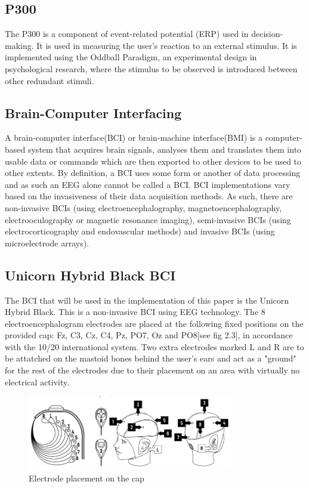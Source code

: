 \subsection{P300}
The P300 is a component of event-related potential (ERP) used in decision-making. It is used in measuring the user's reaction to an external stimulus. It is implemented using the Oddball Paradigm, an experimental design in psychological research, where the stimulus to be observed is introduced between other redundant stimuli.

\subsection{Brain-Computer Interfacing}
A brain-computer interface(BCI) or brain-machine interface(BMI) is a computer-based system that acquires brain signals, analyses them and translates them into usable data or commands which are then exported to other devices to be used to other extents. By definition, a BCI uses some form or another of data processing and as such an EEG alone cannot be called a BCI\cite{Shih_2012}. BCI implementations vary based on the invasiveness of their data acquisition methods. As such, there are non-invasive BCIs (using electroencephalography, magnetoencephalography, electrooculography or magnetic resonance imaging), semi-invasive BCIs (using electrocorticography and endovascular methods) and invasive BCIs (using microelectrode arrays).

\subsection{Unicorn Hybrid Black BCI}
The BCI that will be used in the implementation of this paper is the Unicorn Hybrid Black. This is a non-invasive BCI using EEG technology. The 8 electroencephalogram electrodes are placed at the following fixed positions on the provided cap: Fz, C3, Cz, C4, Pz, PO7, Oz and PO8[see fig 2.3], in accordance with the 10/20 international system. Two extra electrodes marked L and R are to be attatched on the mastoid bones behind the user's ears and act as a "ground" for the rest of the electrodes due to their placement on an area with virtually no electrical activity. 

\begin{figure}[H]
  \centering
  \includegraphics[width=0.8\textwidth]{Graphics/Electrode Placement.png}
  \caption{Electrode placement on the cap}
\end{figure}

